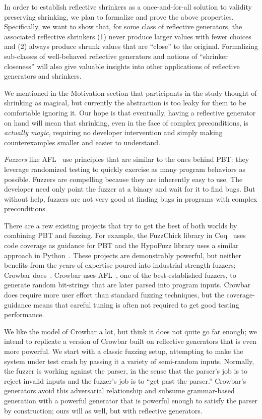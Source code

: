 In order to establish reflective shrinkers as a once-and-for-all solution to
validity preserving shrinking, we plan to formalize and prove the above
properties. Specifically, we want to show that, for some class of reflective
generators, the associated reflective shrinkers (1) never produce larger values
with fewer choices and (2) always produce shrunk values that are ``close'' to
the original. Formalizing sub-classes of well-behaved reflective generators and
notions of ``shrinker closeness'' will also give valuable insights into other
applications of reflective generators and shrinkers.

We mentioned in the Motivation section that participants in the study thought of
shrinking as magical, but currently the abstraction is too leaky for them to
be comfortable ignoring it.  Our hope is that eventually, having a reflective
generator on hand will mean that shrinking, even in the face of complex
preconditions, is {\em actually magic}, requiring no developer intervention and
simply making counterexamples smaller and easier to understand.

{\em Fuzzers} like AFL~\cite{afl-readme} use principles that are similar to the
ones behind PBT: they leverage randomized testing to quickly exercise as many
program behaviors as possible. Fuzzers are compelling because they are
inherently easy to use. The developer need only point the fuzzer at a binary and
wait for it to find bugs. But without help, fuzzers are not very good at finding
bugs in programs with complex preconditions.

There are a rew existing projects that try to get the best of both worlds by
combining PBT and fuzzing.
For example, the FuzzChick library in Coq~\cite{OLDlampropoulos19fuzzchick}
uses code coverage as guidance for PBT and the HypoFuzz library uses a
similar approach in Python~\cite{hatfield-dodds_hypofuzz_nodate}. These projects
are demonstrably powerful, but neither benefits from the years of expertise
poured into industrial-strength fuzzers; Crowbar
does~\cite{dolan2017testing}. Crowbar uses
AFL~\cite{afl-readme}, one of the best-established
fuzzers, to generate random bit-strings that are later parsed into program
inputs. Crowbar does require more user effort than standard fuzzing techniques,
but the coverage-guidance means that careful tuning is often not required to get
good testing performance.

We like the model of Crowbar a lot, but think it does not quite go far enough;
we intend to replicate a version of Crowbar built on reflective generators that
is even more powerful.
We start with a classic fuzzing setup, attempting to make the system under test
crash by passing it a variety of semi-random inputs. Normally, the fuzzer is
working against the parser, in the sense that the parser's job is to reject
invalid inputs and the fuzzer's job is to ``get past the parser.'' Crowbar's
generators avoid this adversarial relationship and subsume grammar-based
generation with a powerful generator that is powerful enough to satisfy the
parser by construction; ours will as well, but with reflective generators.


